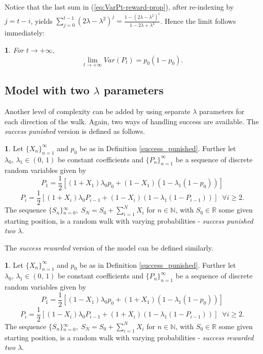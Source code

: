 \documentclass{amsart}
\theoremstyle{definition}
\newtheorem{defn}[thm]{\protect\definitionname}
\theoremstyle{plain}
\theoremstyle{plain}
\newtheorem{cor}[thm]{\protect\corollaryname}
\numberwithin{equation}{section}
\providecommand{\corollaryname}{Corollary}
\providecommand{\definitionname}{Definition}
\begin{document}
Notice that the last sum in (\ref{eq:VarPt-reward-prop}), after re-indexing
by $j=t-i$, yields $\sum_{j=0}^{t-1}(2\lambda-\lambda^{2})^{j}=\frac{1-(2\lambda-\lambda^{2})^{t}}{1-2\lambda+\lambda^{2}}$.
Hence the limit follows immediately:

\begin{cor}
For $t\rightarrow+\infty,$ \textup{
\[
\lim_{t\to+\infty}Var(P_{t})=p_{0}(1-p_{0}).
\]
}
\end{cor}

\subsection{Model with two $\lambda$ parameters}

Another level of complexity can be added by using separate $\lambda$
parameters for each direction of the walk. Again, two ways of handling
success are available. The \emph{success punished} version is defined
as follows.

\begin{defn}
\label{2lambdas}Let ${\{X_{n}\}}_{n=1}^{\infty}$ and $p_{0}$ be
as in Definition \ref{success_punished}. Further let $\lambda_{0},\,\lambda_{1}\in(0,\,1)$
be constant coefficients and ${\{P_{n}\}}_{n=1}^{\infty}$ be a sequence
of discrete random variables given by
\begin{equation}
P_{1}=\frac{1}{2}[(1+X_{1})\lambda_{0}p_{0}+(1-X_{1})(1-\lambda_{1}(1-p_{0}))]\label{eq:P!1_def-1-1}
\end{equation}
\begin{equation}
P_{i}=\frac{1}{2}[(1+X_{i})\lambda_{0}P_{i-1}+(1-X_{i})(1-\lambda_{1}(1-P_{i-1}))]\;\;\forall i\geq2.\label{eq:Pi_def-1-1}
\end{equation}
The sequence ${\{S_{n}\}}{}_{n=0}^{\infty},\;S_{N}=S_{0}+\sum_{i=1}^{N}X_{i}$
for $n\in\mathbb{N}$, with $S_{0}\in\mathbb{R}$ some given starting
position, is a random walk with varying probabilities - \emph{success
punished two $\lambda$}.
\end{defn}

The \emph{success rewarded} version of the model can be defined similarly.

\begin{defn}
\label{2lambdas-reward}Let ${\{X_{n}\}}_{n=1}^{\infty}$ and $p_{0}$
be as in Definition \ref{success_punished}. Further let $\lambda_{0},\,\lambda_{1}\in(0,\,1)$
be constant coefficients and ${\{P_{n}\}}_{n=1}^{\infty}$ be a sequence
of discrete random variables given by
\[
P_{1}=\frac{1}{2}[(1-X_{1})\lambda_{0}p_{0}+(1+X_{1})(1-\lambda_{1}(1-p_{0}))]
\]
\[
P_{i}=\frac{1}{2}[(1-X_{i})\lambda_{0}P_{i-1}+(1+X_{i})(1-\lambda_{1}(1-P_{i-1}))]\;\;\forall i\geq2.
\]
The sequence ${\{S_{n}\}}{}_{n=0}^{\infty},\;S_{N}=S_{0}+\sum_{i=1}^{N}X_{i}$
for $n\in\mathbb{N}$, with $S_{0}\in\mathbb{R}$ some given starting
position, is a random walk with varying probabilities - \emph{success
rewarded two $\lambda$}.
\end{defn}
\end{document}
